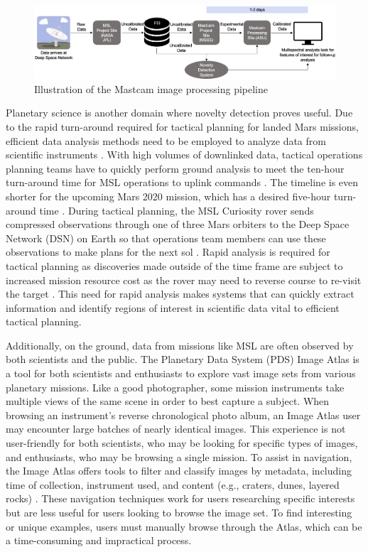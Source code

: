 \begin{figure}
\centering
\includegraphics[width=\linewidth]{figs/msl/DSN.png}
\caption[Mastcam Image Processing Pipeline]{Illustration of the Mastcam image processing pipeline \protect\parencite{kerner2020comparison}}
\label{msl/fig:timeline}
\end{figure}

Planetary science is another domain where novelty detection proves useful. 
Due to the rapid turn-around required for tactical planning for landed Mars missions, efficient data analysis methods need to be employed to analyze data from scientific instruments \parencite{bell2019tactical}.
With high volumes of downlinked data, tactical operations planning teams have to quickly perform ground analysis to meet the ten-hour turn-around time for MSL operations to uplink commands \parencite{samuels2013preparation}. 
The timeline is even shorter for the upcoming Mars 2020 mission, which has a desired five-hour turn-around time \parencite{wilson2017nasa}.
During tactical planning, the MSL Curiosity rover sends compressed observations through one of three Mars orbiters to the Deep Space Network (DSN) on Earth so that operations team members can use these observations to make plans for the next sol \parencite{kerner_multispec}.
Rapid analysis is required for tactical planning as discoveries made outside of the time frame are subject to increased mission resource cost as the rover may need to reverse course to re-visit the target \parencite{kerner2020comparison}.
This need for rapid analysis makes systems that can quickly extract information and identify regions of interest in scientific data vital to efficient tactical planning. 

Additionally, on the ground, data from missions like MSL are often observed by both scientists and the public.
The Planetary Data System (PDS) Image Atlas is a tool for both scientists and enthusiasts to explore vast image sets from various planetary missions. 
Like a good photographer, some mission instruments take multiple views of the same scene in order to best capture a subject. 
When browsing an instrument's reverse chronological photo album, an Image Atlas user may encounter large batches of nearly identical images. 
This experience is not user-friendly for both scientists, who may be looking for specific types of images, and enthusiasts, who may be browsing a single mission. 
To assist in navigation, the Image Atlas offers tools to filter and classify images by metadata, including time of collection, instrument used, and content (e.g., craters, dunes, layered rocks) \parencite{wagstaff2018deep}.
These navigation techniques work for users researching specific interests but are less useful for users looking to browse the image set. 
To find interesting or unique examples, users must manually browse through the Atlas, which can be a time-consuming and impractical process.

